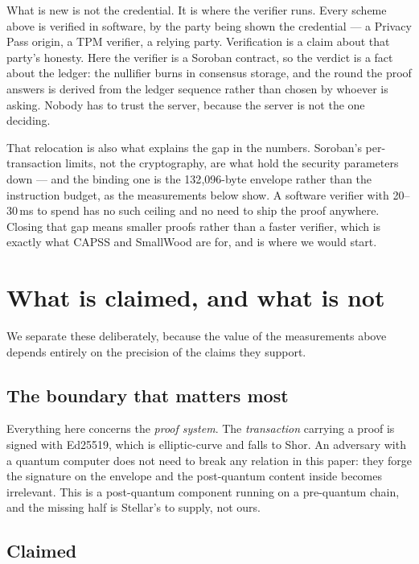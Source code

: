 \documentclass[11pt,a4paper]{article}
\begin{document}
What is new is not the credential. It is where the verifier runs. Every scheme
above is verified in software, by the party being shown the credential --- a
Privacy Pass origin, a TPM verifier, a relying party. Verification is a claim
about that party's honesty. Here the verifier is a Soroban contract, so the
verdict is a fact about the ledger: the nullifier burns in consensus storage,
and the round the proof answers is derived from the ledger sequence rather than
chosen by whoever is asking. Nobody has to trust the server, because the server
is not the one deciding.

That relocation is also what explains the gap in the numbers. Soroban's
per-transaction limits, not the cryptography, are what hold the security
parameters down --- and the binding one is the 132{,}096-byte envelope rather
than the instruction budget, as the measurements below show. A software verifier
with 20--30\,ms to spend has no such ceiling and no need to ship the proof
anywhere. Closing that gap means smaller proofs rather than a faster verifier,
which is exactly what CAPSS and SmallWood are for, and is where we would start.

\section{What is claimed, and what is not}

We separate these deliberately, because the value of the measurements above
depends entirely on the precision of the claims they support.

\subsection{The boundary that matters most}

Everything here concerns the \emph{proof system}. The \emph{transaction}
carrying a proof is signed with Ed25519, which is elliptic-curve and falls to
Shor. An adversary with a quantum computer does not need to break any relation
in this paper: they forge the signature on the envelope and the post-quantum
content inside becomes irrelevant. This is a post-quantum component running on
a pre-quantum chain, and the missing half is Stellar's to supply, not ours.

\subsection{Claimed}
\end{document}
